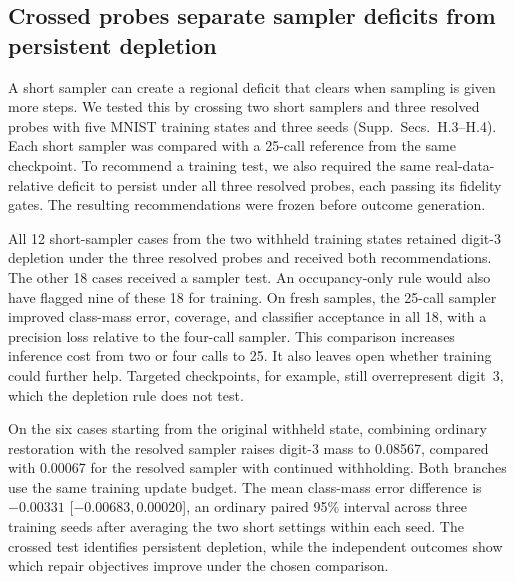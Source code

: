 \subsection{Crossed probes separate sampler deficits from persistent depletion}
\label{sec:crossed-probes}
A short sampler can create a regional deficit that clears when
sampling is given more steps. We tested this by crossing two short samplers and three
resolved probes with five MNIST training states and three seeds
(Supp.~Secs.~H.3--H.4). Each short sampler was compared with a
25-call reference from the same checkpoint. To recommend a training
test, we also required the same real-data-relative deficit to persist
under all three resolved probes, each passing its fidelity gates.
The resulting recommendations were frozen before outcome generation.

All 12 short-sampler cases from the two withheld training states
retained digit-3 depletion under the three resolved probes and received
both recommendations. The other 18 cases received a sampler test.
An occupancy-only rule would also have flagged nine of these 18 for
training. On fresh samples, the 25-call sampler improved class-mass
error, coverage, and classifier acceptance in all 18, with a precision
loss relative to the four-call sampler. This comparison increases
inference cost from two or four calls to 25. It also leaves open
whether training could further help. Targeted checkpoints, for example,
still overrepresent digit~3, which the depletion rule does not test.

On the six cases starting from the original withheld state, combining
ordinary restoration with the resolved sampler raises digit-3 mass
to 0.08567, compared with 0.00067 for the resolved sampler with
continued withholding. Both branches use the same training update
budget. The mean class-mass error difference is $-0.00331$
[$-0.00683,0.00020$], an ordinary paired 95\% interval across three
training seeds after averaging the two short settings within each seed.
The crossed test identifies persistent depletion, while the independent
outcomes show which repair objectives improve under the chosen comparison.
